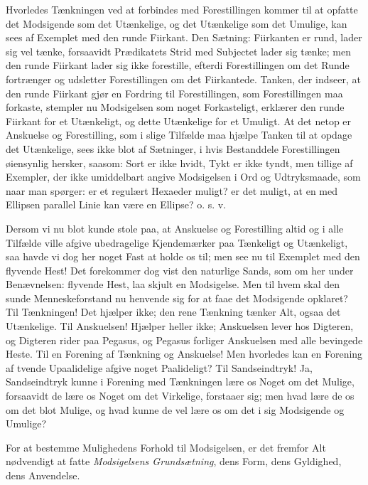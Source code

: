 \documentclass[12pt,a4paper]{book}
\begin{document}
Hvorledes Tænkningen ved at forbindes med Forestillingen kommer til at
opfatte det Modsigende som det Utænkelige, og det Utænkelige som det
Umulige, kan sees af Exemplet med den runde Fiirkant. Den Sætning:
Fiirkanten er rund, lader sig vel tænke, forsaavidt Prædikatets Strid
med Subjectet lader sig tænke; men den runde Fiirkant lader sig ikke
forestille, efterdi Forestillingen om det Runde fortrænger og
udsletter Forestillingen om det Fiirkantede. Tanken, der indseer, at
den runde Fiirkant gjør en Fordring til Forestillingen, som
Forestillingen maa forkaste, stempler nu Modsigelsen som noget
Forkasteligt, erklærer den runde Fiirkant for et Utænkeligt, og dette
Utænkelige for et Umuligt. At det netop er Anskuelse og Forestilling,
som i slige Tilfælde maa hjælpe Tanken til at opdage det Utænkelige,
sees ikke blot af Sætninger, i hvis Bestanddele Forestillingen
øiensynlig hersker, saasom: Sort er ikke hvidt, Tykt er ikke tyndt,
men tillige af Exempler, der ikke umiddelbart angive Modsigelsen i Ord
og Udtryksmaade, som naar man spørger: er
et regulært Hexaeder muligt? er det muligt, at en med Ellipsen
parallel Linie kan være en Ellipse? o. s. v.

Dersom vi nu blot kunde stole paa, at Anskuelse og Forestilling altid
og i alle Tilfælde ville afgive ubedragelige Kjendemærker paa
Tænkeligt og Utænkeligt, saa havde vi dog her noget Fast at holde os
til; men see nu til Exemplet med den flyvende Hest! Det forekommer
dog vist den naturlige Sands, som om her under Benævnelsen: flyvende
Hest, laa skjult en Modsigelse. Men til hvem skal den sunde
Menneskeforstand nu henvende sig for at faae det Modsigende opklaret?
Til Tænkningen! Det hjælper ikke; den rene Tænkning tænker Alt, ogsaa
det Utænkelige. Til Anskuelsen! Hjælper heller ikke; Anskuelsen
lever hos Digteren, og Digteren rider paa Pegasus, og Pegasus forliger
Anskuelsen med alle bevingede Heste. Til en Forening af Tænkning og
Anskuelse! Men hvorledes kan en Forening af tvende Upaalidelige
afgive noget Paalideligt? Til Sandseindtryk! Ja, Sandseindtryk kunne
i Forening med Tænkningen lære os Noget om det Mulige, forsaavidt de
lære os Noget om det Virkelige, forstaaer sig; men hvad lære de os om
det blot Mulige, og hvad kunne de vel lære os om det i sig Modsigende
og Umulige?

For at bestemme Mulighedens Forhold til Modsigelsen, er det fremfor
Alt nødvendigt at fatte \emph{Modsigelsens Grundsætning}, dens Form,
dens Gyldighed, dens Anvendelse.
\end{document}

